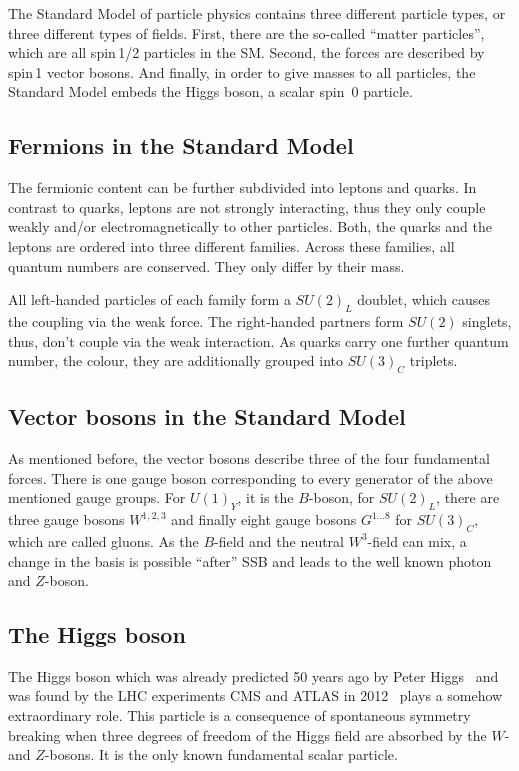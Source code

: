 The Standard Model of particle physics contains three different particle types, or three different types of fields.
First, there are the so-called ``matter particles'', which are all spin\,1/2 particles in the SM.
Second, the forces are described by spin\,1 vector bosons.
And finally, in order to give masses to all particles, the Standard Model embeds the Higgs boson, a scalar spin~0 particle.

\subsection*{Fermions in the Standard Model}
The fermionic content can be further subdivided into leptons and quarks.
In contrast to quarks, leptons are not strongly interacting, thus they only couple weakly and/or electromagnetically to other particles. 
Both, the quarks and the leptons are ordered into three different families.
Across these families, all quantum numbers are conserved.
They only differ by their mass.

All left-handed particles of each family form a $SU(2)_L$ doublet, which causes the coupling via the weak force.
The right-handed partners form $SU(2)$ singlets, thus, don't couple via the weak interaction.
As quarks carry one further quantum number, the colour, they are additionally grouped into $SU(3)_C$ triplets.


\subsection*{Vector bosons in the Standard Model}
As mentioned before, the vector bosons describe three of the four fundamental forces.
There is one gauge boson corresponding to every generator of the above mentioned gauge groups.
For $U(1)_Y$, it is the $B$-boson, for $SU(2)_L$, there are three gauge bosons $W^{1,2,3}$ and finally eight gauge bosons $G^{1...8}$ for $SU(3)_C$, which are called gluons.
As the $B$-field and the neutral $W^3$-field can mix, a change in the basis is possible ``after'' SSB and leads to the well known photon and $Z$-boson.

\subsection*{The Higgs boson}
The Higgs boson which was already predicted 50 years ago by Peter Higgs~\cite{bib:Higgs_Prediction,bib:Higgs_Prediction_2} and was found by the LHC experiments CMS and ATLAS in 2012~\cite{bib:Theory:CMS:HiggsObservation,bib:Theory:Atlas:HiggsObservation} plays a somehow extraordinary role.
This particle is a consequence of spontaneous symmetry breaking when three degrees of freedom of the Higgs field are absorbed by the $W$- and $Z$-bosons.
It is the only known fundamental scalar particle.\\


